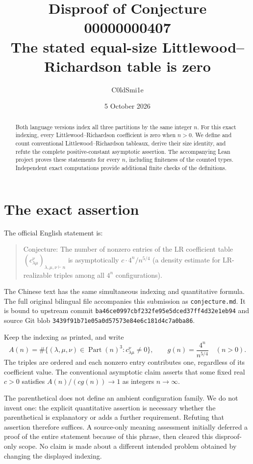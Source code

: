 \documentclass[11pt]{article}
\title{Disproof of Conjecture 00000000407\\[0.3em]
\large The stated equal-size Littlewood--Richardson table is zero}
\author{C0ldSmi1e}
\date{5 October 2026}
\newcommand{\Part}{\operatorname{Part}}
\begin{document}
\maketitle
\begin{abstract}
Both language versions index all three partitions by the same integer $n$.
For this exact indexing, every Littlewood--Richardson coefficient is zero
when $n>0$. We define and count conventional Littlewood--Richardson tableaux,
derive their size identity, and refute the complete positive-constant
asymptotic assertion. The accompanying Lean project proves these statements
for every $n$, including finiteness of the counted types. Independent exact
computations provide additional finite checks of the definitions.
\end{abstract}

\section{The exact assertion}
The official English statement is:
\begin{quote}
Conjecture: The number of nonzero entries of the LR coefficient table
$(c^\nu_{\lambda\mu})_{\lambda,\mu,\nu\vdash n}$ is asymptotically
$c\cdot4^n/n^{5/4}$ (a density estimate for LR-realizable triples among all
$4^n$ configurations).
\end{quote}
The Chinese text has the same simultaneous indexing and quantitative formula.
The full original bilingual file accompanies this submission as
\texttt{conjecture.md}. It is bound to upstream commit
\texttt{ba46ce0997cbf232fe95e5dced37ff4d32e1eb94} and source Git blob
\texttt{3439f91b71e05a0d57573e84e6c181d4c7a0ba86}.

Keep the indexing as printed, and write
\[
 A(n)=\#\{(\lambda,\mu,\nu)\in\Part(n)^3:
                   c^\nu_{\lambda\mu}\ne0\},\qquad
 g(n)=\frac{4^n}{n^{5/4}}\quad(n>0).
\]
The triples are ordered and each nonzero entry contributes one, regardless
of its coefficient value. The conventional asymptotic claim asserts that
some fixed real $c>0$ satisfies $A(n)/(c g(n))\to1$ as integers $n\to\infty$.

The parenthetical does not define an ambient configuration family. We do
not invent one: the explicit quantitative assertion is necessary whether
the parenthetical is explanatory or adds a further requirement. Refuting
that assertion therefore suffices. A source-only meaning assessment initially
deferred a proof of the entire statement because of this phrase, then cleared
this disproof-only scope. No claim is made about a different intended problem
obtained by changing the displayed indexing.
\end{document}
